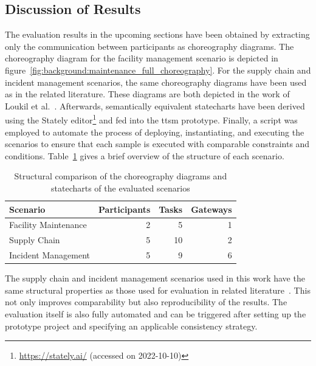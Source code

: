 \subsection{Discussion of Results}
\label{sec:evaluation:simulations:summary}
The evaluation results in the upcoming sections have been obtained by extracting only the communication between participants as choreography diagrams. The choreography diagram for the facility management scenario is depicted in figure~\ref{fig:background:maintenance_full_choreography}. For the supply chain and incident management scenarios, the same choreography diagrams have been used as in the related literature. These diagrams are both depicted in the work of Loukil et al.~\cite{interpreted_bp_on_blockchain_loukil}. Afterwards, semantically equivalent statecharts have been derived using the Stately editor\footnote{\url{https://stately.ai/} (accessed on 2022-10-10)} and fed into the \gls{ttsm} prototype. Finally, a script was employed to automate the process of deploying, instantiating, and executing the scenarios to ensure that each sample is executed with comparable constraints and conditions. Table~\ref{tab:evaluation:simulations:structural_comparison} gives a brief overview of the structure of each scenario.

\begin{table}[h]
\centering
\begin{tabular}{|l|r|r|r|}
    \hline
    \textbf{Scenario} & \textbf{Participants} & \textbf{Tasks} & \textbf{Gateways} \\
    \hline
    Facility Maintenance & 2 & 5 & 1 \\
    Supply Chain & 5 & 10 & 2 \\
    Incident Management & 5 & 9 & 6 \\
    \hline
\end{tabular}
\caption{Structural comparison of the choreography diagrams and statecharts of the evaluated scenarios}
\label{tab:evaluation:simulations:structural_comparison}
\end{table}

The supply chain and incident management scenarios used in this work have the same structural properties as those used for evaluation in related literature~\cite{untrusted_bp_execution_using_blockchain,optimized_execution_of_bp_using_petri_nets_on_blockchain,interpreted_bp_on_blockchain_weber,lean_architecture_for_blockchain_based_process_execution,interpreted_bp_on_blockchain_loukil}. This not only improves comparability but also reproducibility of the results. The evaluation itself is also fully automated and can be triggered after setting up the prototype project and specifying an applicable consistency strategy.

